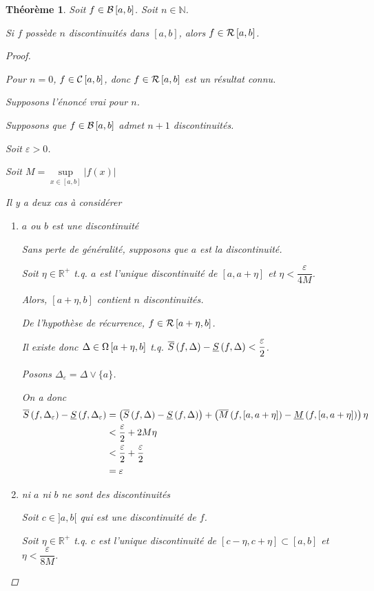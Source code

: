 \documentclass{report}
\newcommand*{\raffinement}[2]{#1 \vee #2}
\newcommand*{\abs}[1]{\left| #1 \right|}
\newcommand*{\eps}{\varepsilon}
\newcommand*{\reels}{\mathbb{R}}
\newcommand*{\naturels}{\mathbb{N}}
\newtheorem*{thm}{Th\'eor\`eme}
\theoremstyle{definition}
\theoremstyle{remark}
\begin{document}
	\begin{thm}
		Soit $f \in \bornee$. Soit $n \in \naturels$.

		Si $f$ poss\`ede $n$ discontinuit\'es dans $[a,b]$, alors $f \in \riemann$.
		\begin{proof}~

			Pour $n=0$, $f \in \continue$, donc $f \in \riemann$ est un r\'esultat connu.

			Supposons l'\'enonc\'e vrai pour $n$.

			Supposons que $f \in \bornee$ admet $n+1$ discontinuit\'es.

			Soit $\eps>0$.

			Soit $M=\sup\limits_{x\in[a,b]}\abs{f(x)}$

			Il y a deux cas \`a consid\'erer

			\begin{enumerate}
				\item $a$ ou $b$ est une discontinuit\'e

				Sans perte de g\'en\'eralit\'e, supposons que $a$ est la discontinuit\'e.

				Soit $\eta \in \reels^+$ t.q. $a$ est l'unique discontinuit\'e de $[a,a+\eta]$ et $\eta < \dfrac{\eps}{4M}$.

				Alors, $[a+\eta,b]$ contient $n$ discontinuit\'es.

				De l'hypoth\`ese de r\'ecurrence, $f \in \riemann[a+\eta,b]$.

				Il existe donc $\Delta \in \partitions[a+\eta,b]$ t.q. $\ssup{f} - \sinf{f} < \dfrac{\eps}{2}$.

				Posons $\Delta_\eps = \raffinement{\Delta}{\{a\}}$.

				On a donc
				\begin{align*}
					\ssup{f}[\Delta_\eps] - \sinf{f}[\Delta_\eps]&= \left( \ssup{f} - \sinf{f} \right) + \left( \msup{f}[a,a+\eta] - \minf{f}[a,a+\eta] \right) \eta\\
					&< \dfrac{\eps}{2} + 2M\eta\\
					&< \dfrac{\eps}{2} + \dfrac{\eps}{2}\\
					&= \eps
				\end{align*}
				\item ni $a$ ni $b$ ne sont des discontinuit\'es

				Soit $c \in ]a,b[$ qui est une discontinuit\'e de $f$.

				Soit $\eta \in \reels^+$ t.q. $c$ est l'unique discontinuit\'e de $[c-\eta,c+\eta] \subset [a,b]$ et $\eta < \dfrac{\eps}{8M}$.


\end{enumerate}
\end{proof}
\end{thm}
\end{document}
